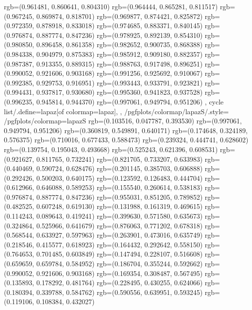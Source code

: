 {{{					rgb=(0.961481, 0.860641, 0.804310)
					rgb=(0.964444, 0.865281, 0.811517)
					rgb=(0.967245, 0.869874, 0.818701)
					rgb=(0.969877, 0.874421, 0.825872)
					rgb=(0.972359, 0.878918, 0.833018)
					rgb=(0.974685, 0.883371, 0.840145)
					rgb=(0.976874, 0.887774, 0.847236)
					rgb=(0.978925, 0.892139, 0.854310)
					rgb=(0.980850, 0.896458, 0.861358)
					rgb=(0.982652, 0.900735, 0.868388)
					rgb=(0.984338, 0.904979, 0.875383)
					rgb=(0.985912, 0.909180, 0.882357)
					rgb=(0.987387, 0.913355, 0.889315)
					rgb=(0.988763, 0.917498, 0.896251)
					rgb=(0.990052, 0.921606, 0.903168)
					rgb=(0.991256, 0.925692, 0.910067)
					rgb=(0.992385, 0.929753, 0.916951)
					rgb=(0.993443, 0.933791, 0.923821)
					rgb=(0.994431, 0.937817, 0.930680)
					rgb=(0.995360, 0.941823, 0.937528)
					rgb=(0.996235, 0.945814, 0.944370)
					rgb=(0.997061, 0.949794, 0.951206)
			},
		cycle list/.define={lapaz}{[of colormap=lapaz]},
		},
		/pgfplots/colormap/lapazS/.style={
			/pgfplots/colormap={lapazS}{%
					rgb=(0.103516, 0.047787, 0.393530)
					rgb=(0.997061, 0.949794, 0.951206)
					rgb=(0.360819, 0.549891, 0.640171)
					rgb=(0.174648, 0.324189, 0.576375)
					rgb=(0.710016, 0.677433, 0.588473)
					rgb=(0.239324, 0.444741, 0.628602)
					rgb=(0.139754, 0.195043, 0.493668)
					rgb=(0.525243, 0.621396, 0.608531)
					rgb=(0.921627, 0.811765, 0.732241)
					rgb=(0.821705, 0.733207, 0.633983)
					rgb=(0.440469, 0.590724, 0.628476)
					rgb=(0.201145, 0.385703, 0.606888)
					rgb=(0.292426, 0.500203, 0.640175)
					rgb=(0.123592, 0.126483, 0.444704)
					rgb=(0.612966, 0.646088, 0.589253)
					rgb=(0.155540, 0.260614, 0.538183)
					rgb=(0.976874, 0.887774, 0.847236)
					rgb=(0.955031, 0.851205, 0.789852)
					rgb=(0.482525, 0.607248, 0.619130)
					rgb=(0.131988, 0.161319, 0.469615)
					rgb=(0.114243, 0.089643, 0.419241)
					rgb=(0.399630, 0.571580, 0.635673)
					rgb=(0.324864, 0.525966, 0.641679)
					rgb=(0.876063, 0.771202, 0.678318)
					rgb=(0.568544, 0.633927, 0.597963)
					rgb=(0.263901, 0.473016, 0.635749)
					rgb=(0.218546, 0.415577, 0.618923)
					rgb=(0.164432, 0.292642, 0.558150)
					rgb=(0.764653, 0.701485, 0.603849)
					rgb=(0.147494, 0.228107, 0.516608)
					rgb=(0.659659, 0.659784, 0.584952)
					rgb=(0.186704, 0.355244, 0.592662)
					rgb=(0.990052, 0.921606, 0.903168)
					rgb=(0.169354, 0.308487, 0.567495)
					rgb=(0.135893, 0.178292, 0.481764)
					rgb=(0.228495, 0.430255, 0.624066)
					rgb=(0.180394, 0.339788, 0.584762)
					rgb=(0.590556, 0.639951, 0.593245)
					rgb=(0.119106, 0.108384, 0.432027)
}}}
